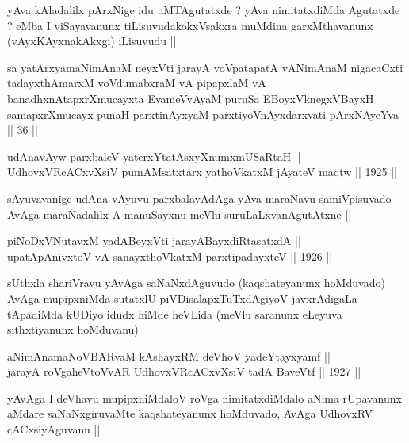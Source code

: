 \begin{artha}
yAva kAladalilx pArxNige idu uMTAgutatxde ? yAva nimitatxdiMda
Agutatxde ? eMba I viSayavanunx tiLisuvudakokxVsakxra muMdina
garxMthavanunx (vAyxKAyxnakAkxgi) iLisuvudu ||
\end{artha}


\begin{shl}
sa yatArxyamaNimAnaM neyxVti jarayA voVpatapatA vANimAnaM nigacaCxti tadayxthAmarxM voVdumabxraM vA pipapxlaM vA banadhxnAtapxrXmucayxta EvameVvAyaM puruSa EBoyxV\s knegxVBayxH samapxrXmucayx punaH parxtinAyxyaM parxtiyoVnAyxdarxvati pArxNAyeYva || 36 ||
\end{shl}


\begin{shl}
udAnavAyw parxbaleV yaterxYtatAsxyXnumxmUSaRtaH ||  \\
UdhovxVRcACxvXsiV pumAMsatxtarx yathoVkatxM jAyateV maqtw ||  1925 ||  
\end{shl}

\begin{artha}
sAyuvavanige udAna vAyuvu parxbalavAdAga yAva maraNavu samiVpisuvado
AvAga maraNadalilx A manuSayxnu meVlu suruLaLxvanAgutAtxne ||
\end{artha}


\begin{shl}
piNoDxV\s NutavxM yadA\s BeyxVti jarayA\s BayxdiRtasatxdA || \\
upatApAnivxtoV vA sanayxthoVkatxM parxtipadayxteV ||  1926 ||  
\end{shl}

\begin{artha}
sUthxla shariVravu yAvAga saNaNxdAguvudo (kaqshateyanunx hoMduvado)
AvAga mupipxniMda sutatxlU piVDisalapxTuTxdAgiyoV javxrAdigaLa
tApadiMda kUDiyo idudx hiMde heVLida (meVlu saranunx eLeyuva
sithxtiyanunx hoMduvanu)
\end{artha}

\begin{shl}
aNimAnamaNoVBARvaM kAshayxRM deVhoV yadeYtayxyamf || \\
jarayA roVgaheVtoVvAR UdhovxVRcACxvXsiV tadA BaveVtf ||  1927 ||  
\end{shl}

\begin{artha}
yAvAga I deVhavu mupipxniMdaloV roVga nimitatxdiMdalo aNima rUpavanunx
aMdare saNaNxgiruvaMte kaqshateyanunx hoMduvado, AvAga UdhovxRV
cACxsiyAguvanu ||
\end{artha}

